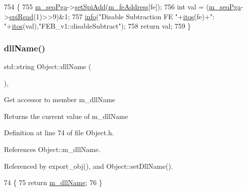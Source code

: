 \begin{DoxyCode}
754                                     \{
755   \hyperlink{classFEB__v1_a6c7804ac86796f233a8393043adf2e77}{m\_seqPga}->\hyperlink{classSeqPGA_ac998ce3a6d9b5f2e88cc8393f8c1df53}{setSpiAdd}(\hyperlink{classFEB__v1_a4e1945c2d5b434125f375e9d0fc6d99f}{m\_feAddress}[fe]);
756   \textcolor{keywordtype}{int} val = (\hyperlink{classFEB__v1_a6c7804ac86796f233a8393043adf2e77}{m\_seqPga}->\hyperlink{classSeqPGA_ab3d0e5e5d4014bc7a92588a76b8713d4}{spiRead}(1)>>9)&1;
757   \hyperlink{classObject_a644fd329ea4cb85f54fa6846484b84a8}{info}(\textcolor{stringliteral}{"Disable Subtraction FE "}+\hyperlink{Tools_8h_af330027dbdafb9a30768b3613c553e60}{itos}(fe)+\textcolor{stringliteral}{": "}+\hyperlink{Tools_8h_af330027dbdafb9a30768b3613c553e60}{itos}(val),\textcolor{stringliteral}{"FEB\_v1::disableSubtract"});
758   \textcolor{keywordflow}{return} val;
759 \}
\end{DoxyCode}
\mbox{\label{classObject_a2e3947f2870094c332d7454117f3ec63}} 
\subsubsection{\texorpdfstring{dll\+Name()}{dllName()}}
{\footnotesize\ttfamily std\+::string Object\+::dll\+Name (\begin{DoxyParamCaption}{ }\end{DoxyParamCaption})\hspace{0.3cm}{\ttfamily [inline]}, {\ttfamily [inherited]}}

Get accessor to member m\+\_\+dll\+Name \begin{DoxyReturn}{Returns}
the current value of m\+\_\+dll\+Name 
\end{DoxyReturn}


Definition at line 74 of file Object.\+h.



References Object\+::m\+\_\+dll\+Name.



Referenced by export\+\_\+obj(), and Object\+::set\+Dll\+Name().


\begin{DoxyCode}
74                        \{
75     \textcolor{keywordflow}{return} \hyperlink{classObject_a01afbeacebb8db6831559972ec362eb3}{m\_dllName};
76   \}  
\end{DoxyCode}
\mbox{\label{classFEB__v1_ac8186be2d5fd8122092d6475e77395e9}} 
